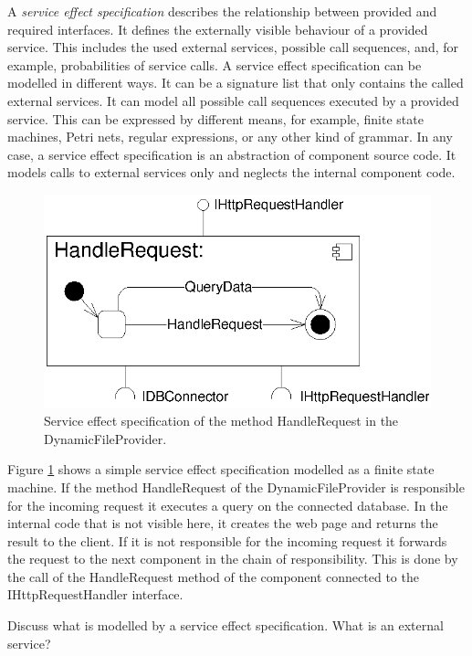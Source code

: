 A \emph{service effect specification} describes the relationship between
provided and required interfaces. It defines the externally visible behaviour of
a provided service. This includes the used external services, possible call
sequences, and, for example, probabilities of service calls. A service effect
specification can be modelled in different ways. It can be a signature list that
only contains the called external services. It can model all possible call
sequences executed by a provided service. This can be expressed by different
means, for example, finite state machines, Petri nets, regular expressions, or
any other kind of grammar. In any case, a service effect specification is an
abstraction of component source code. It models calls to external services only
and neglects the internal component code.

\begin{figure}[htbp]
\centering
\includegraphics[scale=0.85]{example/HandleRequestSEFF}
\caption{Service effect specification of the method HandleRequest in the
DynamicFileProvider.}
\label{fig:seff}
\end{figure}

Figure \ref{fig:seff} shows a simple service effect specification modelled as a
finite state machine. If the method HandleRequest of the DynamicFileProvider is
responsible for the incoming request it executes a query on the connected
database. In the internal code that is not visible here, it creates the web page
and returns the result to the client. If it is not responsible for the incoming
request it forwards the request to the next component in the chain of
responsibility. This is done by the call of the HandleRequest method of the
component connected to the IHttpRequestHandler interface.

Discuss what is modelled by a service effect specification. What is an external
service?

